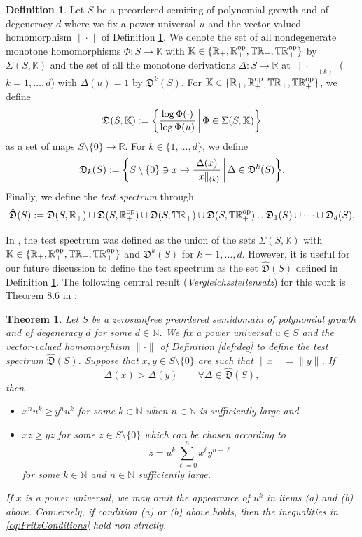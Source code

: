 \documentclass[12pt,a4paper,reqno]{amsart}
\newcommand{\rgeq}{\trianglerighteq}
\newtheorem{theorem}[proposition]{Theorem}
\theoremstyle{definition}
\newtheorem{definition}[proposition]{Definition}
\newcommand{\mf}[1]{\mathfrak{#1}}
\newcommand{\mb}[1]{\mathbb{#1}}
\newcommand{\N}{\mathbb N}
\newcommand{\R}{\mathbb R}
\newcommand{\T}{\mathbb T}
\let\originalleft\left
\let\originalright\right
\renewcommand{\left}{\mathopen{}\mathclose\bgroup\originalleft}
\renewcommand{\right}{\aftergroup\egroup\originalright}
\begin{document}
\begin{definition}\label{def:TestSpectrum}
Let $S$ be a preordered semiring of polynomial growth and of degeneracy $d$ where we fix a power universal $u$ and the vector-valued homomorphism $\|\cdot\|$ of Definition \ref{def:TestSpectrum}. We denote the set of all nondegenerate monotone homomorphisms $\Phi:S\to\mb K$ with $\mb K\in\{\R_+,\R_+^{\rm op},\T\R_+,\T\R_+^{\rm op}\}$ by $\Sigma(S,\mb K)$ and the set of all the monotone derivations $\Delta:S\to\R$ at $\|\cdot\|_{(k)}$ ($k=1,\ldots,d$) with $\Delta(u)=1$ by $\mf D^k(S)$. For $\mb K\in\{\R_+,\R_+^{\rm op},\T\R_+,\T\R_+^{\rm op}\}$, we define
$$
\mf D(S,\mb K):=\left\{\frac{\log{\Phi(\cdot)}}{\log{\Phi(u)}}\,\middle|\,\Phi\in\Sigma(S,\mb K)\right\}
$$
as a set of maps $S\setminus\{0\}\to\R$. For $k\in\{1,\ldots,d\}$, we define
$$
\mf D_k(S):=\left\{S\setminus\{0\}\ni x\mapsto\frac{\Delta(x)}{\|x\|_{(k)}}\,\middle|\,\Delta\in\mf D^k(S)\right\}.
$$
Finally, we define the {\it test spectrum} through
$$
\hat{\mf D}(S):=\mf D(S,\R_+)\cup\mf D(S,\R_+^{\rm op})\cup\mf D(S,\T\R_+)\cup\mf D(S,\T\R_+^{\rm op})\cup\mf D_1(S)\cup\cdots\cup\mf D_d(S).
$$
\end{definition}

In \cite{FritzII}, the test spectrum was defined as the union of the sets $\Sigma(S,\mb K)$ with $\mb K\in\{\R_+,\R_+^{\rm op},\T\R_+,\T\R_+^{\rm op}\}$ and $\mf D^k(S)$ for $k=1,\ldots,d$. However, it is useful for our future discussion to define the test spectrum as the set $\hat{\mf D}(S)$ defined in Definition \ref{def:TestSpectrum}. The following central result ({\it Vergleichsstellensatz}) for this work is Theorem 8.6 in \cite{FritzII}:

\begin{theorem}\label{thm:Vergleichsstellensatz}
Let $S$ be a zerosumfree preordered semidomain of polynomial growth and of degeneracy $d$ for some $d\in\N$. We fix a power universal $u\in S$ and the vector-valued homomorphism $\|\cdot\|$ of Definition \ref{def:deg} to define the test spectrum $\hat{\mf D}(S)$. Suppose that $x,y\in S\setminus\{0\}$ are such that $\|x\|=\|y\|$. If
\begin{equation}\label{eq:FritzConditions}
\Delta(x)>\Delta(y)\qquad\forall\Delta\in\hat{\mf D}(S),
\end{equation}
then
\begin{itemize}
\item[(a)] $x^nu^k\rgeq y^nu^k$ for some $k\in\N$ when $n\in\N$ is sufficiently large and
\item[(b)] $xz\rgeq yz$ for some $z\in S\setminus\{0\}$ which can be chosen according to
$$
z=u^k\sum_{\ell=0}^n x^\ell y^{n-\ell}
$$
for some $k\in\N$ and $n\in\N$ sufficiently large.
\end{itemize}
If $x$ is a power universal, we may omit the appearance of $u^k$ in items (a) and (b) above. Conversely, if condition (a) or (b) above holds, then the inequalities in \eqref{eq:FritzConditions} hold non-strictly.
\end{theorem}
\end{document}
